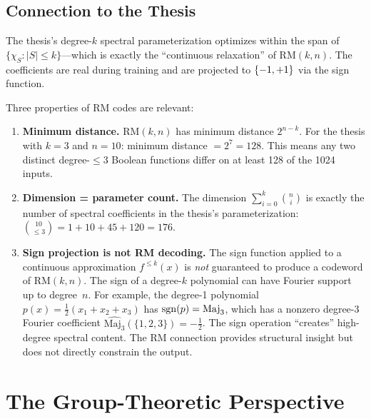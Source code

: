 \subsection{Connection to the Thesis}\label{sec:rm-thesis}

The thesis's degree-$k$ spectral parameterization optimizes within the
span of $\{\chi_S : |S| \leq k\}$---which is exactly the ``continuous
relaxation'' of $\text{RM}(k, n)$. The coefficients are real during
training and are projected to $\{-1,+1\}$ via the sign function.

Three properties of RM codes are relevant:

\begin{enumerate}[label=(\roman*)]
  \item \textbf{Minimum distance.}
    $\text{RM}(k, n)$ has minimum distance $2^{n-k}$. For the thesis
    with $k = 3$ and $n = 10$: minimum distance $= 2^7 = 128$. This
    means any two distinct degree-$\leq 3$ Boolean functions differ on
    at least 128 of the 1024 inputs.

  \item \textbf{Dimension = parameter count.}
    The dimension $\sum_{i=0}^k \binom{n}{i}$ is exactly the number of
    spectral coefficients in the thesis's parameterization:
    $\binom{10}{\leq 3} = 1 + 10 + 45 + 120 = 176$.

  \item \textbf{Sign projection is not RM decoding.}
    The sign function applied to a continuous approximation
    $f^{\leq k}(x)$ is \emph{not} guaranteed to produce a codeword of
    $\text{RM}(k, n)$. The sign of a degree-$k$ polynomial can have
    Fourier support up to degree~$n$. For example, the degree-1
    polynomial $p(x) = \frac{1}{2}(x_1 + x_2 + x_3)$ has
    $\operatorname{sgn}(p) = \text{Maj}_3$, which has a nonzero degree-3 Fourier
    coefficient $\widehat{\text{Maj}_3}(\{1,2,3\}) = -\frac{1}{2}$.
    The sign operation ``creates'' high-degree spectral content. The RM
    connection provides structural insight but does not directly
    constrain the output.
\end{enumerate}


\section{The Group-Theoretic Perspective}\label{sec:group-theory}

